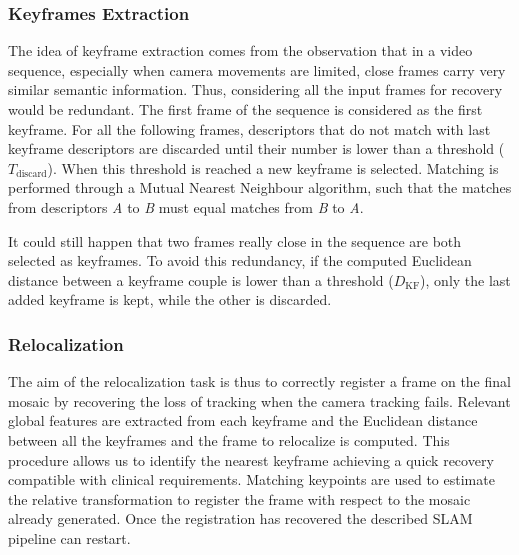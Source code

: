 \documentclass[sn-basic]{sn-jnl}%
\begin{document}
\subsubsection{Keyframes Extraction} \label{sec:keyframe_extraction}
The idea of keyframe extraction comes from the observation that in a video sequence, especially when camera movements are limited, close frames carry very similar semantic information. Thus, considering all the input frames for recovery would be redundant. 
The first frame of the sequence is considered as the first keyframe. For all the following frames, descriptors that do not match with last keyframe descriptors are discarded until their number is lower than a threshold ($T_{\textrm{discard}}$). 
When this threshold is reached a new keyframe is selected. Matching is performed through a Mutual Nearest Neighbour algorithm, such that the matches from descriptors \textit{A} to \textit{B} must equal matches from \textit{B} to \textit{A}.

It could still happen that two frames really close in the sequence are both selected as keyframes. To avoid this redundancy, if the computed Euclidean distance between a keyframe couple is lower than a threshold ($D_{\textrm{KF}}$), only the last added keyframe is kept, while the other is discarded.


\subsubsection{Relocalization} \label{sec:relocalization}


The aim of the relocalization task is thus to correctly register a frame on the final mosaic by recovering the loss of tracking when the camera tracking fails.
Relevant global features are extracted from each keyframe and the Euclidean distance between all the keyframes and the frame to relocalize is computed. This procedure allows us to identify the nearest keyframe achieving a quick recovery compatible with clinical requirements. 
Matching keypoints are used to estimate the relative transformation to register the frame with respect to the mosaic already generated. Once the registration has recovered the described SLAM pipeline can restart.
\end{document}
